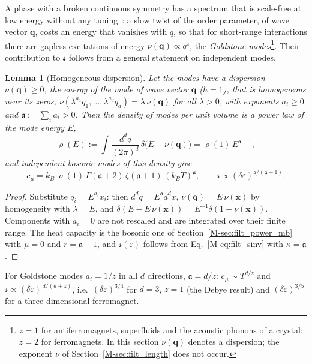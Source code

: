 \documentclass[10pt,a4paper]{article}
\theoremstyle{plain}
\newtheorem{lemma}{Lemma}
\theoremstyle{remark}
\newcommand{\lds}{\mathscr{s}}  %
\begin{document}
A phase with a broken continuous symmetry has a spectrum that is scale-free
at low energy without any tuning~\cite{Goldstone1961,GSW1962}: a slow twist
of the order parameter, of wave vector $\mathbf q$, costs an energy that
vanishes with $q$, so that for short-range interactions there are gapless
excitations of energy $\nu(\mathbf q)\propto q^{z}$, the \emph{Goldstone
modes}\footnote{$z=1$ for antiferromagnets, superfluids and the acoustic
phonons of a crystal; $z=2$ for ferromagnets. In this section
$\nu(\mathbf q)$ denotes a dispersion; the exponent $\nu$ of
Section~\ref{M-sec:filt_length} does not occur.}. Their contribution to $\lds$
follows from a general statement on independent modes.

\begin{lemma}[Homogeneous dispersion]\label{lem:disp}
Let the modes have a dispersion $\nu(\mathbf q)\ge0$, the energy of the mode
of wave vector $\mathbf q$ ($\hbar=1$), that is homogeneous near its zeros,
$\nu(\lambda^{a_1}q_1,\dots,\lambda^{a_d}q_d)=\lambda\,\nu(\mathbf q)$
for all $\lambda>0$, with exponents $a_i\ge0$ and $\mathfrak a:=\sum_ia_i>0$. Then
the density of modes per unit volume is a power law of the mode energy $E$,
\[
  \varrho(E):=\int\frac{d^{d}q}{(2\pi)^{d}}\,\delta\big(E-\nu(\mathbf q)\big)
  =\varrho(1)\,E^{\mathfrak a-1} ,
\]
and independent bosonic modes of this density give
\begin{equation}\label{eq:filt_lemma}
  c_\mu=k_B\,\varrho(1)\,\Gamma(\mathfrak a+2)\,\zeta(\mathfrak a+1)\,(k_BT)^{\mathfrak a} ,
  \qquad
  \lds\propto (\delta\varepsilon)^{\mathfrak a/(\mathfrak a+1)} .
\end{equation}
\end{lemma}
\begin{proof}
Substitute $q_i=E^{a_i}x_i$: then $d^{d}q=E^{\mathfrak a}d^{d}x$,
$\nu(\mathbf q)=E\,\nu(\mathbf x)$ by homogeneity with $\lambda=E$, and
$\delta(E-E\,\nu(\mathbf x))=E^{-1}\delta(1-\nu(\mathbf x))$.
Components with $a_i=0$ are not rescaled and are integrated over their
finite range. The heat capacity is the bosonic one of
Section~\ref{M-sec:filt_power_mb} with $\mu=0$ and $r=\mathfrak a-1$, and
$\lds(\varepsilon)$ follows from Eq.~\eqref{M-eq:filt_sinv} with
$\kappa=\mathfrak a$.
\end{proof}
For Goldstone modes $a_i=1/z$ in all $d$ directions, $\mathfrak a=d/z$:
$c_{\mu}\sim T^{d/z}$ and $\lds\propto(\delta\varepsilon)^{\,d/(d+z)}$, i.e.\
$(\delta\varepsilon)^{3/4}$ for $d=3$, $z=1$ (the Debye result) and
$(\delta\varepsilon)^{3/5}$ for a three-dimensional ferromagnet.
\end{document}
